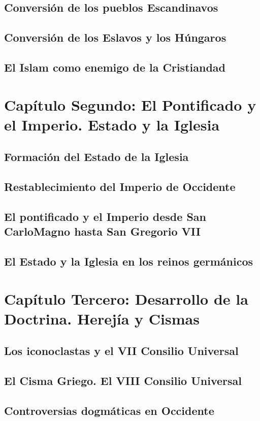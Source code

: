 \raggedbottom{} \documentclass[12pt, a4paper]{book}
\begin{document}
\section{Conversión de los pueblos Escandinavos}
\section{Conversión de los Eslavos y los Húngaros}
\section{El Islam como enemigo de la Cristiandad}
\chapter{Capítulo Segundo: El Pontificado y el Imperio. Estado y la Iglesia}
\section{Formación del Estado de la Iglesia}
\section{Restablecimiento del Imperio de Occidente}
\section{El pontificado y el Imperio desde San CarloMagno hasta San Gregorio VII}
\section{El Estado y la Iglesia en los reinos germánicos}
\chapter{Capítulo Tercero: Desarrollo de la Doctrina. Herejía y Cismas}
\section{Los iconoclastas y el VII Consilio Universal}
\section{El Cisma Griego. El VIII Consilio Universal}
\section{Controversias dogmáticas en Occidente}
\end{document}
